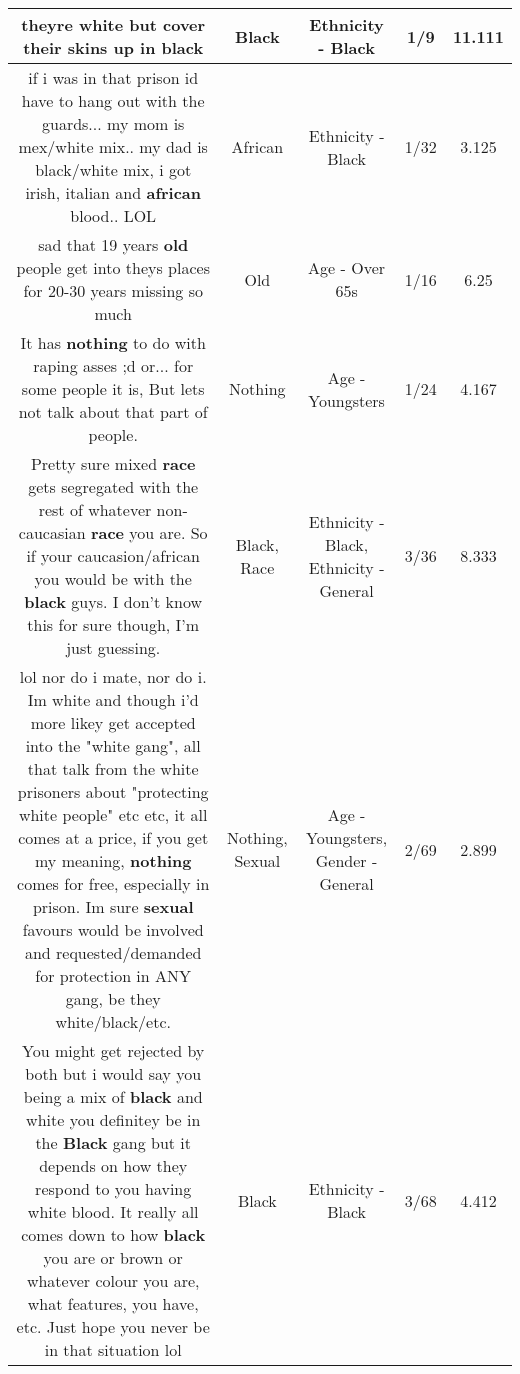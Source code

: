 \documentclass[11pt]{article}
\newlength\mylength
\begin{document}
\begin{center}
\begin{longtable}{|C{.65\mylength}|C{.30\mylength}|C{.12\mylength}|C{.12\mylength}|C{.12\mylength}|}
  \small theyre white but cover their skins up in black\normalsize   & Black & Ethnicity - Black & 1/9 & 11.111 \\  \hline
  \small if i was in that prison id have to hang out with the guards... my mom is mex/white mix.. my dad is black/white mix, i got irish, italian and \textbf{african} blood.. LOL\normalsize   & African & Ethnicity - Black & 1/32 & 3.125 \\  \hline
  \small sad that 19 years \textbf{old} people get into theys places for 20-30 years missing so much\normalsize   & Old & Age - Over 65s & 1/16 & 6.25 \\  \hline
  \small It has \textbf{nothing} to do with raping asses ;d or... for some people it is, But lets not talk about that part of people.\normalsize   & Nothing & Age - Youngsters & 1/24 & 4.167 \\  \hline
  \small Pretty sure mixed \textbf{race} gets segregated with the rest of whatever non-caucasian \textbf{race} you are.  So if your caucasion/african you would be with the \textbf{black} guys.  I don't know this for sure though, I'm just guessing.\normalsize   & Black, Race & Ethnicity - Black, Ethnicity - General & 3/36 & 8.333 \\  \hline
  \small lol nor do i mate, nor do i. Im white and though i'd more likey get accepted into the "white gang", all that talk from the white prisoners about "protecting white people" etc etc, it all comes at a price, if you get my meaning, \textbf{nothing} comes for free, especially in prison. Im sure \textbf{sexual} favours would be involved and requested/demanded for protection in ANY gang, be they white/black/etc.\normalsize   & Nothing, Sexual & Age - Youngsters, Gender - General & 2/69 & 2.899 \\  \hline
  \small You might get rejected by both but i would say you being a mix of \textbf{black} and white you definitey be in the \textbf{Black} gang but it depends on how they respond to you having white blood. It really all comes down to how \textbf{black} you are or brown or whatever colour you are, what features, you have, etc. Just hope you never be in that situation lol\normalsize   & Black & Ethnicity - Black & 3/68 & 4.412 \\  \hline

\end{longtable}
\end{center}
\end{document}

